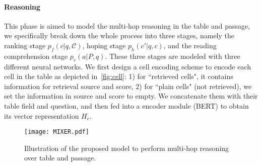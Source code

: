 \documentclass[11pt,a4paper]{article}
\begin{document}
\paragraph{Reasoning}
This phase is aimed to model the multi-hop reasoning in the table and passage, we specifically break down the whole process into three stages, namely the ranking stage $p_{f}(c | q, \mathcal{C})$, hoping stage $p_{h}(c' | q, c)$, and the reading comprehension stage $p_{r}(a | P, q)$. These three stages are modeled with three different neural networks. We first design a cell encoding scheme to encode each cell in the table as depicted in~\autoref{fig:cell}: 1) for ``retrieved cells", it contains information for retrieval source and score, 2) for ``plain cells" (not retrieved), we set the information in source and score to empty. We concatenate them with their table field and question, and then fed into a encoder module (BERT) to obtain its vector representation $H_c$.
\begin{figure}[!t]
    \centering
    \texttt{[image: MIXER.pdf]}
    \vspace{-2ex}
    \caption{Illustration of the proposed model to perform multi-hop reasoning over table and passage.}
    \label{fig:mixer}
    \vspace{-2ex}
\end{figure}
\end{document}
